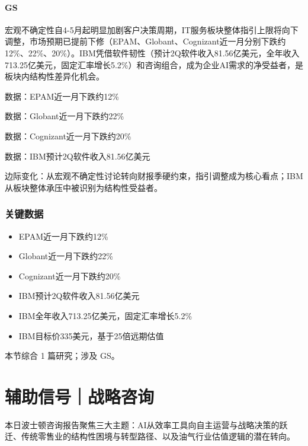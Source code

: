 \documentclass[11pt]{ctexart}
\begin{document}
\paragraph{GS} 宏观不确定性自4-5月起明显加剧客户决策周期，IT服务板块整体指引上限将向下调整，市场预期已提前下修（EPAM、Globant、Cognizant近一月分别下跌约12\%、22\%、20\%）。IBM凭借软件韧性（预计2Q软件收入81.56亿美元，全年收入713.25亿美元，固定汇率增长5.2\%）和咨询组合，成为企业AI需求的净受益者，是板块内结构性差异化机会。
{\small\color{refgray}数据：EPAM近一月下跌约12\%\par}
{\small\color{refgray}数据：Globant近一月下跌约22\%\par}
{\small\color{refgray}数据：Cognizant近一月下跌约20\%\par}
{\small\color{refgray}数据：IBM预计2Q软件收入81.56亿美元\par}
{\small\color{refgray}边际变化：从宏观不确定性讨论转向财报季硬约束，指引调整成为核心看点；IBM从板块整体承压中被识别为结构性受益者。\par}
\subsubsection*{关键数据}
\begin{itemize}
  \item EPAM近一月下跌约12\%
  \item Globant近一月下跌约22\%
  \item Cognizant近一月下跌约20\%
  \item IBM预计2Q软件收入81.56亿美元
  \item IBM全年收入713.25亿美元，固定汇率增长5.2\%
  \item IBM目标价335美元，基于25倍远期估值
\end{itemize}
{\small\color{refgray}本节综合 1 篇研究；涉及 GS。}
\newpage
\section{辅助信号｜战略咨询}
本日波士顿咨询报告聚焦三大主题：AI从效率工具向自主运营与战略决策的跃迁、传统零售业的结构性困境与转型路径、以及油气行业估值逻辑的潜在转向。
\end{document}
